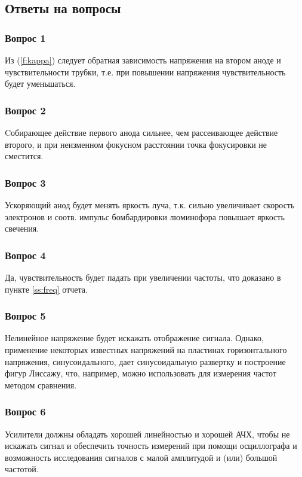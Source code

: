 \subsection*{Ответы на вопросы}

\subsubsection*{Вопрос 1}

Из (\ref{f:kappa}) следует обратная зависимость напряжения на втором аноде и чувствительности трубки, т.е. при повышении напряжения чувствительность будет уменьшаться.

\subsubsection*{Вопрос 2}
Cобирающее действие первого анода сильнее, чем рассеивающее действие второго, и при неизменном фокусном расстоянии точка фокусировки не сместится. 

\subsubsection*{Вопрос 3}
Ускоряющий анод будет менять яркость луча, т.к. сильно увеличивает скорость электронов и соотв. импульс бомбардировки люминофора повышает яркость свечения.

\subsubsection*{Вопрос 4}
Да, чувствительность будет падать при увеличении частоты, что доказано в пункте \ref{ss:freq} отчета.

\subsubsection*{Вопрос 5}
Нелинейное напряжение будет искажать отображение сигнала. Однако, применение некоторых известных напряжений на пластинах горизонтального напряжения, синусоидального, дает синусоидальную развертку и построение фигур Лиссажу, что, например, можно использовать для измерения частот методом сравнения.

\subsubsection*{Вопрос 6}
Усилители должны обладать хорошей линейностью и хорошей АЧХ, чтобы не искажать сигнал и обеспечить точность измерений при помощи осциллографа и возможность исследования сигналов с малой амплитудой и (или) большой частотой.


